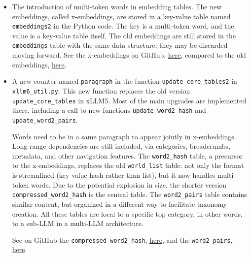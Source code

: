 \documentclass[oneside,10pt]{book}
\begin{document}
\begin{itemize}
\item The introduction of multi-token words in embedding tables. The new embeddings, called
\textcolor{index}{x-embeddings}, are stored in a key-value table named \texttt{embeddings2} in the Python code.
The key is a multi-token word, and the value is a key-value table itself. 
The old embeddings are still stored in the
 \texttt{embeddings} table with the same data structure; they may be discarded moving forward. 
See the x-embeddings on GitHub, \href{https://raw.githubusercontent.com/VincentGranville/Large-Language-Models/main/xllm6/xllm6_embeddings2.txt}{here}, compared to the old embeddings, \href{https://github.com/VincentGranville/Large-Language-Models/blob/main/xllm6/xllm6_embeddings2.txt}{here}. 
\vspace{1ex}
\item A new counter named \texttt{paragraph} in the function \texttt{update\_core\_tables2} in \texttt{xllm6\_util.py}. This new function replaces the old version
\texttt{update\_core\_tables} in xLLM5. Most of the main upgrades are implemented there, including a call to new functions 
\texttt{update\_word2\_hash} and 
\texttt{update\_word2\_pairs}.

\noindent Words need to be in a same paragraph to appear jointly in x-embeddings. Long-range dependencies are still included, via categories,
 breadcrumbs, metadata, and other navigation features. The \texttt{word2\_hash} table, a precursor to the x-embeddings, replaces the old 
\texttt{world\_list} table: not only the format is streamlined (key-value hash rather than list), but it now handles multi-token words. Due to the
 potential explosion in size, the shorter version \texttt{compressed\_word2\_hash} is the central table. 
The \texttt{word2\_pairs} table contains similar content, but organized in a different way to facilitate taxonomy creation. All these tables are local to a
 specific top category, in other words, to a sub-LLM in a multi-LLM architecture. 

\noindent See on GitHub the \texttt{compressed\_word2\_hash}, 
\href{https://github.com/VincentGranville/Large-Language-Models/blob/main/xllm6/xllm6_compressed_word2_hash.txt}{here}, and the  \texttt{word2\_pairs}, 
\href{https://github.com/VincentGranville/Large-Language-Models/blob/main/xllm6/xllm6_word2_pairs.txt}{here}.
\vspace{1ex}


\end{itemize}
\end{document}
